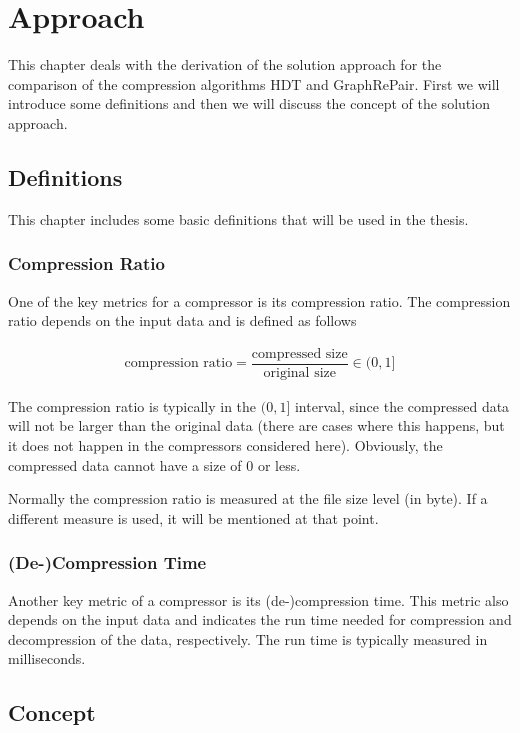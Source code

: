 \chapter{Approach}\label{ch:approach}

This chapter deals with the derivation of the solution approach for the comparison of the compression algorithms HDT and GraphRePair. First we will introduce some definitions and then we will discuss the concept of the solution approach.

\section{Definitions}

This chapter includes some basic definitions that will be used in the thesis.

\subsection{Compression Ratio}

One of the key metrics for a compressor is its compression ratio. The compression ratio depends on the input data and is defined as follows

\begin{align*}
	\text{compression ratio} = \dfrac{\text{compressed size}}{\text{original size}} \in (0,1]
\end{align*}

The compression ratio is typically in the $(0,1]$ interval, since the compressed data will not be larger than the original data (there are cases where this happens, but it does not happen in the compressors considered here). Obviously, the compressed data cannot have a size of 0 or less.

Normally the compression ratio is measured at the file size level (in byte). If a different measure is used, it will be mentioned at that point.

\subsection{(De-)Compression Time}

Another key metric of a compressor is its (de-)compression time. This metric also depends on the input data and indicates the run time needed for compression and decompression of the data, respectively. The run time is typically measured in milliseconds.

\section{Concept}

